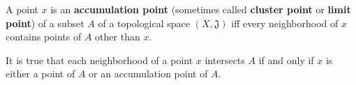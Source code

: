 A point $x$ is an \textbf{accumulation point} (sometimes called \textbf{cluster point} or \textbf{limit point}) of a subset $A$ of a topological space $(X, \mathfrak{J})$ iff every neighborhood of $x$ contains points of $A$ other than $x$.

It is true that each neighborhood of a point $x$ intersects $A$ if and only if $x$ is either a point of $A$ or an accumulation point of $A$.
